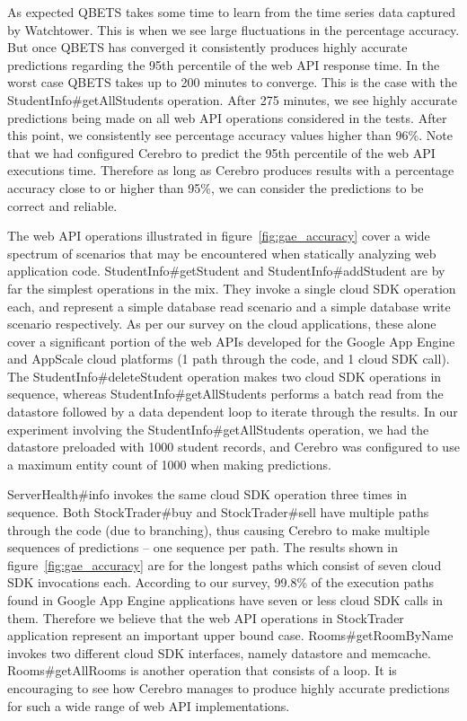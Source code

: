 As expected QBETS takes some time to learn
from the time series data captured by Watchtower. This is when we see large fluctuations in the percentage accuracy. But
once QBETS has converged it consistently produces highly accurate predictions regarding the 95th percentile of the web API
response time. In the worst case QBETS takes up to 200 minutes to converge. This is the case with the
StudentInfo\#getAllStudents operation. After 275 minutes, we see highly accurate predictions being made on all web API
operations considered in the tests. After this point, we consistently see percentage accuracy values higher than 96\%. Note that
we had configured Cerebro to predict the 95th percentile of the web API executions time. Therefore as long as Cerebro produces
results with a percentage accuracy close to or higher than 95\%, we can consider the predictions to be correct and reliable.

The web API operations illustrated in figure~\ref{fig:gae_accuracy} cover a wide spectrum of scenarios that may be encountered
when statically analyzing web application code. StudentInfo\#getStudent and StudentInfo\#addStudent are by far the simplest
operations in the mix. They invoke a single cloud SDK operation each, and represent a simple database read scenario and a simple
database write scenario respectively. As per our survey on the cloud applications, these alone cover a significant portion of the 
web APIs developed for the Google App Engine and AppScale cloud platforms (1 path through the code, and 1 cloud SDK call). 
The StudentInfo\#deleteStudent operation makes two cloud SDK operations in sequence, whereas
StudentInfo\#getAllStudents performs a batch read from the datastore followed by a data dependent loop to iterate through the results.
In our experiment involving the StudentInfo\#getAllStudents operation, we had the datastore preloaded with 1000 student records, 
and Cerebro was configured to use a maximum entity count of 1000 when making predictions.

ServerHealth\#info invokes the same cloud SDK operation three times in sequence. Both StockTrader\#buy and StockTrader\#sell have
multiple paths through the code (due to branching), thus causing Cerebro to make multiple sequences of predictions -- one sequence
per path. The results shown in figure~\ref{fig:gae_accuracy} are for the longest paths which consist of seven cloud SDK invocations each. According to
our survey, 99.8\% of the execution paths found in Google App Engine applications have seven or less cloud SDK calls in them. Therefore we believe
that the web API operations in StockTrader application represent an important upper bound case. Rooms\#getRoomByName
invokes two different cloud SDK interfaces, namely datastore and memcache. Rooms\#getAllRooms is another operation that consists of
a loop. It is encouraging to see how Cerebro manages to produce highly accurate predictions for such a wide range of web API implementations.

